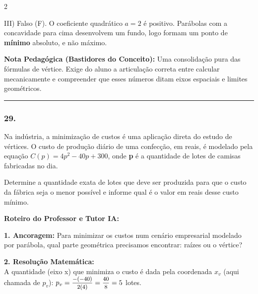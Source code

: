 \begin{multicols*}{2}
\begin{tcolorbox}[colback=CorTitUm!5, colframe=CorTitUm, boxrule=1pt, arc=4pt, left=6pt, right=6pt, top=6pt, bottom=6pt]
    III) Falso (F). O coeficiente quadrático $a = 2$ é positivo. Parábolas com a concavidade para cima desenvolvem um fundo, logo formam um ponto de \textbf{mínimo} absoluto, e não máximo.
    \end{tcolorbox}
    \vspace{0.15cm}
    
    \begin{boxexplicacao}
    \textbf{Nota Pedagógica (Bastidores do Conceito):} Uma consolidação pura das fórmulas de vértice. Exige do aluno a articulação correta entre calcular mecanicamente e compreender que esses números ditam eixos espaciais e limites geométricos.
    \end{boxexplicacao}
\fi

\par\vspace{\espacoQuestao}

\noindent\textcolor{CorLinha}{\rule{\linewidth}{0.5pt}} 
\par\vspace{\espacoPreQuestao}
\subsubsection*{29.} 
\begin{enunciadoLiteral}
Na indústria, a minimização de custos é uma aplicação direta do estudo de vértices. O custo de produção diário de uma confecção, em reais, é modelado pela equação $C(p) = 4p^2 - 40p + 300$, onde \textbf{p} é a quantidade de lotes de camisas fabricadas no dia.

Determine a quantidade exata de lotes que deve ser produzida para que o custo da fábrica seja o menor possível e informe qual é o valor em reais desse custo mínimo.
\end{enunciadoLiteral}

\ifgabarito
    \begin{tcolorbox}[colback=CorTitUm!5, colframe=CorTitUm, boxrule=1pt, arc=4pt, left=6pt, right=6pt, top=6pt, bottom=6pt]
    \small\textbf{\textcolor{CorTitUm}{Roteiro do Professor e Tutor IA:}}\par\vspace{0.1cm}
    \color{CinzaEscuro}
    \textbf{1. Ancoragem:} Para minimizar os custos num cenário empresarial modelado por parábola, qual parte geométrica precisamos encontrar: raízes ou o vértice?\par\vspace{0.1cm}
    \textbf{2. Resolução Matemática:}\\
    A quantidade (eixo x) que minimiza o custo é dada pela coordenada $x_v$ (aqui chamada de $p_v$):
    $p_v = \mfrac{-(-40)}{2(4)} = \mfrac{40}{8} = 5$ lotes.
    

\end{tcolorbox}
\end{multicols*}
